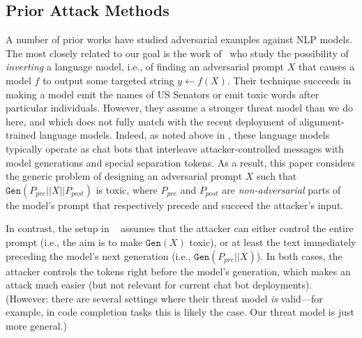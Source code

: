 \documentclass{article}
\newcommand{\gen}{\texttt{Gen}}
\begin{document}
\subsection{Prior Attack Methods}
A number of prior works have studied adversarial examples against NLP models.
%
The most closely related to our goal is the work of~\citet{jones2023automatically} who
study
the possibility of \emph{inverting} a language model, i.e., of finding an adversarial prompt $X$ that causes a model $f$ to output some targeted string $y \gets f(X)$. 
Their technique succeeds in %
making a model emit the names of US Senators or emit toxic words after particular individuals. However, %
they assume a stronger threat model than we do here, and which does not fully match with the recent deployment of alignment-trained language models.
Indeed, as noted above in , these language models typically operate as chat bots that interleave attacker-controlled messages with model generations and special separation tokens. As a result, this paper considers the generic problem of designing an adversarial prompt $X$ such that $\gen(P_{pre} || X || P_{post})$ is toxic, where $P_{pre}$ and $P_{post}$ are \emph{non-adversarial} parts of the model's prompt that
respectively precede and succeed the attacker's input.
%
%

In contrast, the setup in ~\citet{jones2023automatically} assumes that the attacker can either control the entire prompt (i.e., the aim is to make $\gen(X)$ toxic), or at least the text immediately preceding the model's next generation (i.e., $\gen(P_{pre} || X)$).
In both cases, the attacker controls the tokens right before the model's generation, which makes an attack much easier (but not relevant for current chat bot deployments).
%
(However: there are several settings where their threat model \emph{is}
valid---for example, in code completion tasks this is likely the case.
Our threat model is just more general.)

\end{document}

